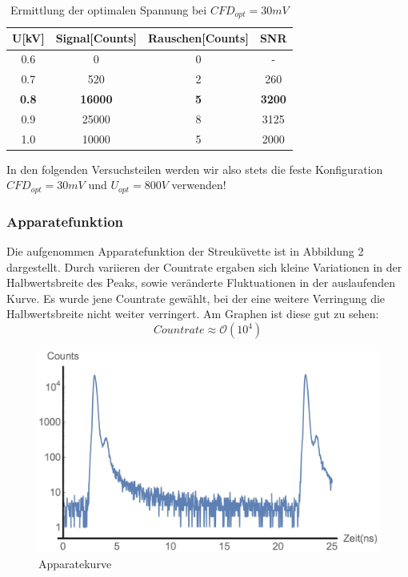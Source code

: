 \documentclass{article}
\begin{document}
\begin{table}[h]
  \centering
  \begin{tabular}{c|c|c|c}
    U[kV] & Signal[Counts] & Rauschen[Counts] & SNR \\
    \hline
    0.6   &     0          & 0                & -\\
    0.7   &    520         & 2                & 260\\
    \textbf{0.8}   &  \textbf{16000}         & \textbf{5}                & \textbf{3200}\\
    0.9   &     25000      & 8                & 3125\\
    1.0   &     10000      & 5                & 2000\\
  \end{tabular}
  \caption{Ermittlung der optimalen Spannung bei $CFD_{opt}=30mV$}
\end{table}

In den folgenden Versuchsteilen werden wir also stets die feste Konfiguration $CFD_{opt}=30mV$ und $ U_{opt}=800V$ verwenden!

\subsubsection{Apparatefunktion}
Die aufgenommen Apparatefunktion der Streuküvette ist in Abbildung 2 dargestellt. Durch variieren der Countrate ergaben sich
kleine Variationen in der Halbwertsbreite des Peaks, sowie veränderte Fluktuationen in der auslaufenden Kurve. Es wurde jene Countrate
gewählt, bei der eine weitere Verringung die Halbwertsbreite nicht weiter verringert. Am Graphen ist diese gut zu sehen:
$$Countrate \approx \mathcal{O}(10^4)$$

\begin{figure}[h]
  \centering
  \includegraphics[width=\textwidth]{Bilder/apparatekurve.jpg}
  \caption{Apparatekurve}
\end{figure}
\end{document}

